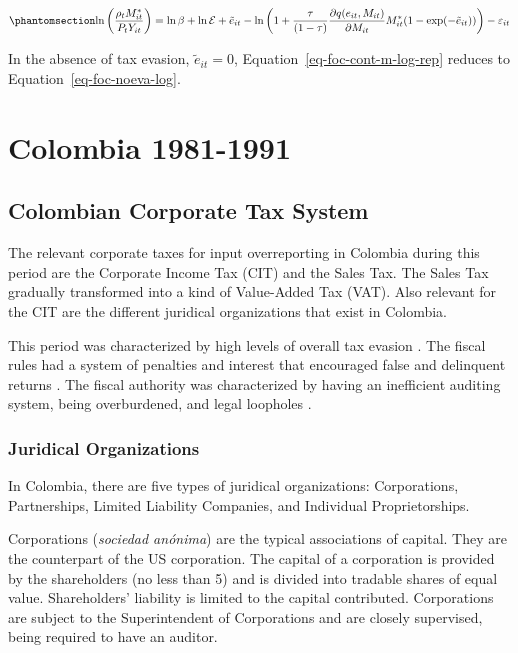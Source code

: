 \documentclass[
  12pt]{article}
\theoremstyle{definition}
\theoremstyle{remark}
\begin{document}
\begin{equation}\phantomsection\label{eq-foc-cont-m-log-rep}{
\ln\left(\frac{\rho_tM^*_{it}}{P_tY_{it}}\right)=\ln\beta+\ln\mathcal{E}+\tilde{e}_{it}-\ln\left(1+\frac{\tau}{(1-\tau)}\frac{\partial q(e_{it},M_{it})}{\partial M_{it}}M^*_{it}(1-\exp(-\tilde{e}_{it}))\right)-\varepsilon_{it} 
}\end{equation}

In the absence of tax evasion, \(\tilde{e}_{it}=0\),
Equation~\ref{eq-foc-cont-m-log-rep} reduces to
Equation~\ref{eq-foc-noeva-log}.

\section{Colombia 1981-1991}\label{colombia-1981-1991}

\subsection{Colombian Corporate Tax
System}\label{colombian-corporate-tax-system}

The relevant corporate taxes for input overreporting in Colombia during
this period are the Corporate Income Tax (CIT) and the Sales Tax. The
Sales Tax gradually transformed into a kind of Value-Added Tax (VAT).
Also relevant for the CIT are the different juridical organizations that
exist in Colombia.

This period was characterized by high levels of overall tax evasion
\citep{Sanchez1994}. The fiscal rules had a system of penalties and
interest that encouraged false and delinquent returns
\citep{McLure1989}. The fiscal authority was characterized by having an
inefficient auditing system, being overburdened, and legal loopholes
\citep{Perry1990}.

\subsubsection{Juridical Organizations}\label{juridical-organizations}

In Colombia, there are five types of juridical organizations:
Corporations, Partnerships, Limited Liability Companies, and Individual
Proprietorships.

Corporations (\emph{sociedad anónima}) are the typical associations of
capital. They are the counterpart of the US corporation. The capital of
a corporation is provided by the shareholders (no less than 5) and is
divided into tradable shares of equal value. Shareholders' liability is
limited to the capital contributed. Corporations are subject to the
Superintendent of Corporations and are closely supervised, being
required to have an auditor.
\end{document}
